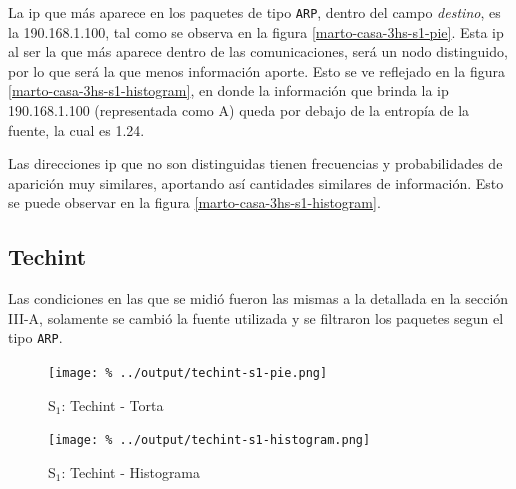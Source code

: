 \documentclass[final,inline,a4paper,narroweqnarray]{ieee}
\begin{document}
  La ip que más aparece en los paquetes de tipo \texttt{ARP}, dentro del
  campo \textit{destino}, es la 190.168.1.100, tal como se observa en la
  figura \ref{marto-casa-3hs-s1-pie}. Esta ip al ser la que más aparece
  dentro de las comunicaciones, será un nodo distinguido, por lo que será la
  que menos información aporte. Esto se ve reflejado en la figura
  \ref{marto-casa-3hs-s1-histogram}, en donde la información que brinda la
  ip 190.168.1.100 (representada como A) queda por debajo de la entropía de
  la fuente, la cual es 1.24.  

  Las direcciones ip que no son distinguidas tienen frecuencias y
  probabilidades de aparición muy similares, aportando así
  cantidades similares de información. Esto se puede observar en la figura
  \ref{marto-casa-3hs-s1-histogram}.


  \subsection{Techint}

  Las condiciones en las que se midió fueron las mismas a la detallada en la
  sección III-A, solamente se cambió la fuente utilizada y se filtraron los
  paquetes segun el tipo \texttt{ARP}.  

    \begin{figure}[H]\begin{center}
      \texttt{[image: \%
      ../output/techint-s1-pie.png]}
      \vspace{-2em}
      \caption{S$_1$: Techint - Torta}
      \label{techint-s1-pie}
    \end{center}\end{figure}

    \begin{figure}[H]\begin{center}
      \texttt{[image: \%
      ../output/techint-s1-histogram.png]}
      \vspace{-2em}
      \caption{S$_1$: Techint - Histograma}
      \label{techint-s1-histogram}
    \end{center}\end{figure}
  
\end{document}
